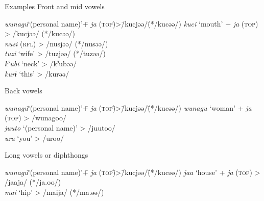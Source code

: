 \begin{exe}
\ex\label{ex:10.2} Examples
\ea Front and mid vowels  
    \begin{tabbing}
    \textit{wunagu}\hspace{\tabcolsep}\=‘(personal name)’\hspace{\tabcolsep}\=+  \textit{ja} (\textsc{top})\hspace{\tabcolsep}\=\hspace{\tabcolsep}>\hspace{\tabcolsep}\=/kucjəə/\hspace{\tabcolsep}\=(*/kucəə/)\kill
    \textit{kuci}  \> ‘mouth’  \> +  \textit{ja} (\textsc{top}) \> > \> /kucjəə/  \> (*/kucəə/)\\
    \textit{nusi}  \> (\textsc{rfl})    \>                      \> > \> /nusjəə/  \> (*/nusəə/)\\
    \textit{tuzi}  \> ‘wife’   \>                      \> > \> /tuzjəə/  \> (*/tuzəə/)\\
    \textit{kˀubi} \>  ‘neck’  \>                      \> > \> /kˀubəə/  \>           \\
    \textit{kurɨ}  \> ‘this’   \>                      \> > \> /kurəə/   \>           \\
    \end{tabbing}
\ex  Back vowels  
    \begin{tabbing}
    \textit{wunagu}\hspace{\tabcolsep}\=‘(personal name)’\hspace{\tabcolsep}\=+  \textit{ja} (\textsc{top})\hspace{\tabcolsep}\=\hspace{\tabcolsep}>\hspace{\tabcolsep}\=/kucjəə/\hspace{\tabcolsep}\=(*/kucəə/)\kill
    \textit{wunagu} \>  ‘woman’          \> +  \textit{ja} (\textsc{top}) \> > \> /wunagoo/ \\
    \textit{juuto}  \> ‘(personal name)’ \>                      \> > \> /juutoo/  \\
    \textit{ura}    \> ‘you’             \>                      \> > \> /uroo/    \\
    \end{tabbing}
\ex Long vowels or diphthongs  
    \begin{tabbing}
    \textit{wunagu}\hspace{\tabcolsep}\=‘(personal name)’\hspace{\tabcolsep}\=+  \textit{ja} (\textsc{top})\hspace{\tabcolsep}\=\hspace{\tabcolsep}>\hspace{\tabcolsep}\=/kucjəə/\hspace{\tabcolsep}\=(*/kucəə/)\kill
    \textit{jaa} \> ‘house’  \> +  \textit{ja} (\textsc{top}) \> > \> /jaaja/ \> (*/ja.oo/)\\
    \textit{mai} \> ‘hip’    \>                      \> > \> /maija/ \> (*/ma.əə/)\\
    \end{tabbing}
\z
\end{exe}
